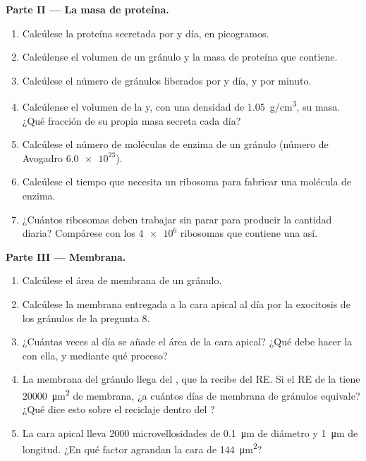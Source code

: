 \begin{problem}
\medskip
\noindent\textbf{Parte II --- La masa de proteína.}
\begin{enumerate}[resume]
  \item Calcúlese la proteína secretada por  y día, en picogramos.
  \item Calcúlense el volumen de un gránulo y la masa de proteína que
        contiene.
  \item Calcúlese el número de gránulos liberados por  y día, y por
        minuto.
  \item Calcúlense el volumen de la  y, con una densidad de
        \qty{1.05}{g/cm^3}, su masa. ¿Qué fracción de su propia masa
        secreta cada día?
  \item Calcúlese el número de moléculas de enzima de un gránulo (número de
        Avogadro $\num{6.0e23}$).
  \item Calcúlese el tiempo que necesita un ribosoma para fabricar una
        molécula de enzima.
  \item ¿Cuántos ribosomas deben trabajar sin parar para producir la
        cantidad diaria? Compárese con los $\num{4e6}$ ribosomas que
        contiene una  así.
\end{enumerate}

\medskip
\noindent\textbf{Parte III --- Membrana.}
\begin{enumerate}[resume]
  \item Calcúlese el área de membrana de un gránulo.
  \item Calcúlese la membrana entregada a la cara apical al día por la
        exocitosis de los gránulos de la pregunta 8.
  \item ¿Cuántas veces al día se añade el área de la cara apical? ¿Qué debe
        hacer la  con ella, y mediante qué proceso?
  \item La membrana del gránulo llega del , que la recibe del RE. Si
        el RE de la  tiene \qty{20000}{\micro m^2} de membrana,
        ¿a cuántos días de membrana de gránulos equivale? ¿Qué dice esto
        sobre el reciclaje dentro del ?
  \item La cara apical lleva \qty{2000}{} microvellosidades de
        \qty{0.1}{\micro m} de diámetro y \qty{1}{\micro m} de longitud.
        ¿En qué factor agrandan la cara de \qty{144}{\micro m^2}?
\end{enumerate}


\end{problem}
